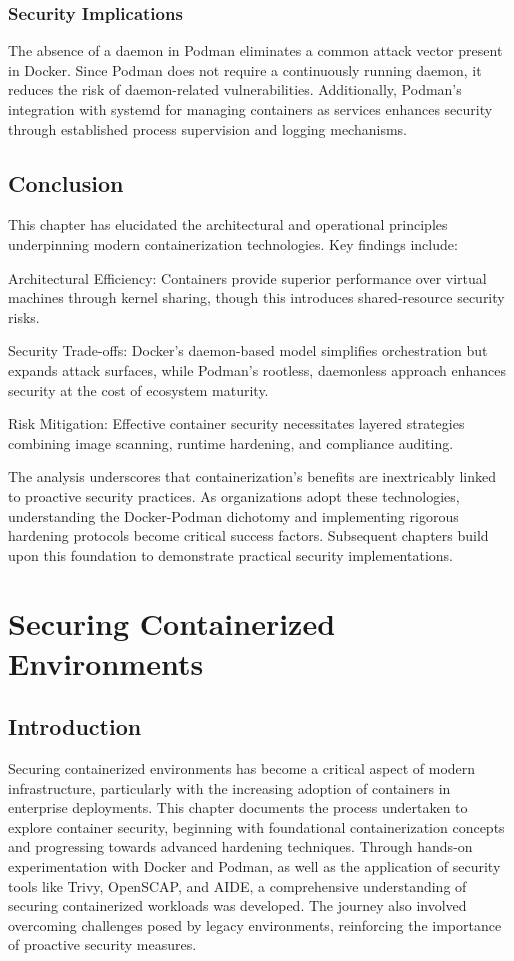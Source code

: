 \documentclass[12pt,a4paper]{report}
\begin{document}
\subsection{Security Implications}
The absence of a daemon in Podman eliminates a common attack vector present in Docker. Since Podman does not require a continuously running daemon, it reduces the risk of daemon-related vulnerabilities. Additionally, Podman's integration with systemd for managing containers as services enhances security through established process supervision and logging mechanisms.
\section{Conclusion}
This chapter has elucidated the architectural and operational principles underpinning modern containerization technologies. Key findings include:

Architectural Efficiency: Containers provide superior performance over virtual machines through kernel sharing, though this introduces shared-resource security risks.

Security Trade-offs: Docker’s daemon-based model simplifies orchestration but expands attack surfaces, while Podman’s rootless, daemonless approach enhances security at the cost of ecosystem maturity.

Risk Mitigation: Effective container security necessitates layered strategies combining image scanning, runtime hardening, and compliance auditing.

The analysis underscores that containerization’s benefits are inextricably linked to proactive security practices. As organizations adopt these technologies, understanding the Docker-Podman dichotomy and implementing rigorous hardening protocols become critical success factors. Subsequent chapters build upon this foundation to demonstrate practical security implementations.


\newpage
\newpage\chapter{Securing Containerized Environments}
\section{Introduction}

Securing containerized environments has become a critical aspect of modern infrastructure, particularly with the increasing adoption of containers in enterprise deployments. This chapter documents the process undertaken to explore container security, beginning with foundational containerization concepts and progressing towards advanced hardening techniques. Through hands-on experimentation with Docker and Podman, as well as the application of security tools like Trivy, OpenSCAP, and AIDE, a comprehensive understanding of securing containerized workloads was developed. The journey also involved overcoming challenges posed by legacy environments, reinforcing the importance of proactive security measures.
\end{document}
